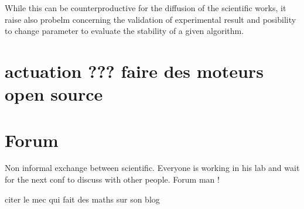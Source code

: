 While this can be counterproductive for the diffusion of the scientific works, it raise also probelm concerning the validation of experimental result and posibility to change parameter to evaluate the stability of a given algorithm.

\section{actuation ??? faire des moteurs open source} %
\label{sec:section_name}



\section{Forum} %
\label{sec:forum}
Non informal exchange between scientific.
Everyone is working in his lab and wait for the next conf to discuss with other people.
Forum man !

citer le mec qui fait des maths sur son blog
